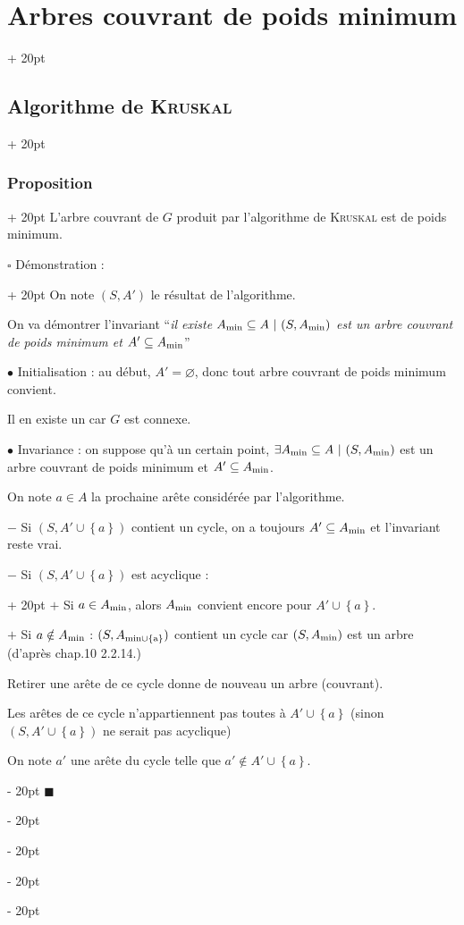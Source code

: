 \documentclass[a4paper, 12pt, twoside]{article}
\newcommand{\set}[1]{\left\{ #1 \right\}}
\newcommand{\ind}[1][20pt]{\advance\leftskip + #1}
\newcommand{\deind}[1][20pt]{\advance\leftskip - #1}
\newenvironment{indt}[2][20pt]{#2 \par \ind[#1]}{\par \deind} %
\newenvironment{proof}[1][{Démonstration :}]{\begin{indt}{$\square$ #1}}{$\blacksquare$ \end{indt}}
\begin{document}
\begin{indt}{\section{Arbres couvrant de poids minimum}}
\begin{indt}{\subsection{Algorithme de \textsc{Kruskal}}}
\begin{indt}{\subsubsection{Proposition}}
                L'arbre couvrant de $G$ produit par l'algorithme de \textsc{Kruskal} est de poids minimum.

                \vspace{12pt}
                
                \begin{proof}
                    On note $(S, A')$ le résultat de l'algorithme.

                    On va démontrer l'invariant ``\textit{il existe $A_{\rm min} \subseteq A\ |\ (S, A_{\rm min})$ est un arbre couvrant de poids minimum et $A' \subseteq A_{\rm min}$}''

                    \vspace{6pt}
                    
                    $\bullet$ Initialisation : au début, $A' = \varnothing$, donc tout arbre couvrant de poids minimum convient.

                    Il en existe un car $G$ est connexe.

                    \vspace{6pt}
                    
                    $\bullet$ Invariance : on suppose qu'à un certain point, $\exists A_{\rm min} \subseteq A\ |\ (S, A_{\rm min})$ est un arbre couvrant de poids minimum et $A' \subseteq A_{\rm min}$.

                    On note $a \in A$ la prochaine arête considérée par l'algorithme.

                    $-$ Si $(S, A' \cup \set a)$ contient un cycle, on a toujours $A' \subseteq A_{\rm min}$ et l'invariant reste vrai.

                    \begin{indt}{$-$ Si $(S, A' \cup \set a)$ est acyclique :}
                        $+$ Si $a \in A_{\rm min}$, alors $A_{\rm min}$ convient encore pour $A' \cup \set a$.

                        $+$ Si $a \notin A_{\rm min}$ : $(S, A_{\rm min \cup \set a})$ contient un cycle car $(S, A_{\rm min})$ est un arbre (d'après chap.10 2.2.14.)

                        Retirer une arête de ce cycle donne de nouveau un arbre (couvrant).

                        Les arêtes de ce cycle n'appartiennent pas toutes à $A' \cup \set a$ (sinon $(S, A' \cup \set a)$ ne serait pas acyclique)

                        On note $a'$ une arête du cycle telle que $a' \notin A' \cup \set a$.


\end{indt}
\end{proof}
\end{indt}
\end{indt}
\end{indt}
\end{document}
